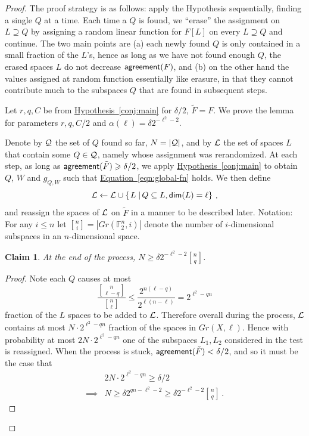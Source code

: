 \documentclass[11pt]{article}
\numberwithin{equation}{section}
\newtheorem{claim}[theorem]{Claim}
\theoremstyle{definition}
\theoremstyle{plain}
\newcommand{\Q}{\mathbb Q}
\newcommand{\expref}[2]{\hyperref[#2]{#1~\ref{#2}}}
\newcommand{\expeqref}[2]{\hyperref[#2]{#1~\eqref{#2}}}
\newcommand\card[1]{\left| {#1} \right|}
\newcommand\sett[2]{\left\{ \left. #1 \;\right\vert #2 \right\}}
\renewcommand\geq{\geqslant}
\renewcommand\ge{\geqslant}
\renewcommand\leq{\leqslant}
\renewcommand\le{\leqslant}
\renewcommand\supset{\supseteq}
\def\L{\mathcal{L}}
\def\F{\mathbb{F}}
\def\L{\mathcal{L}}
\def\Q{\mathcal{Q}}
\def\agr{{\sf agreement}}
\begin{document}
\begin{proof}
The proof strategy is as follows: apply the Hypothesis sequentially, finding a single $Q$ at a time. Each time a $Q$
is found, we ``erase'' the assignment on $L\supset Q$ by assigning a random linear function for $F[L]$ on every $L\supset Q$ and continue. The two main points are (a) each newly found $Q$ is only contained
in a small fraction of the $L$'s, hence as long as we have not found enough $Q$, the erased spaces $L$ do not decrease $\agr(F)$,  and (b) on the other hand the values assigned at random function essentially like erasure, in that they cannot contribute much to the
subspaces $Q$
%
that are found in subsequent steps.

Let $r,q,C$ be from \expref{Hypothesis}{conj:main} for $\delta/2$,
$\tilde{F} = F$. We prove the lemma for parameters $r,q,C/2$ and
$\alpha(\ell) = \delta 2^{-\ell^2 - 2}$.

\def\L{{\cal L}}
\def\Q{{\cal Q}}
Denote by ${\cal Q}$ the set of $Q$ found so far, $N=\card{{\cal Q}}$,
and by $\L$ the set of spaces $L$ that contain some $Q\in \Q$, namely  whose assignment was rerandomized. At each step, as long as $\agr(\tilde F)\ge \delta/2$, we apply \expref{Hypothesis}{conj:main} to obtain $Q$, $W$ and $g_{Q,W}$ such that \expeqref{Equation}{eqn:global-fn}
holds. We then define
\[
\L\leftarrow \L\cup\sett{L}{Q\subseteq L,{\sf dim}(L)=\ell}\,,
\]
and reassign the spaces of $\L$ on $\tilde{F}$ in a manner to be described later.
Notation: For any $i\le n$ let ${n \brack i} = \card{Gr(\F_2^n,i)}$ denote the number of $i$-dimensional subspaces in an
$n$-dimensional space.
\begin{claim}
At the end of the process, $N\geq \delta 2^{-\ell^2 - 2}{n \brack q}$.
\end{claim}
\begin{proof}
Note each $Q$ causes at most
\[
\frac{{n \brack \ell - q}}{{n \brack \ell}}\leq \frac{2^{n(\ell-q)}}{2^{\ell(n-\ell)}}
=2^{\ell^2-qn}
\]
fraction of the $L$ spaces to be added to $\L$. Therefore overall during the process, $\L$ contains at most $N\cdot 2^{\ell^2-qn}$ fraction of the spaces in $Gr(X,\ell)$. Hence with probability at most $2N\cdot 2^{\ell^2-qn}$ one of the subspaces $L_1,L_2$ considered in the test is reassigned. When the process is stuck, $\agr(\tilde{F})< \delta/2$, and so it
must be the case that
\begin{align*}
& 2N\cdot 2^{\ell^2-qn} \geq \delta/2 \\
\implies &N\geq \delta 2^{qn-\ell^2 - 2}\geq \delta 2^{-\ell^2 - 2}{n \brack q}\,.
\end{align*}
\end{proof}


\end{proof}
\end{document}
